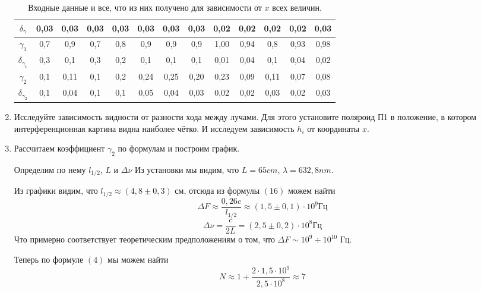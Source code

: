 \documentclass[a4paper, 12pt]{article}%
\begin{document}
\begin{enumerate}
\begin{table}[h!]
\begin{center}
\begin{tabular}{|c|c|c|c|c|c|c|c|c|c|c|c|c|}
$\delta_{\gamma}$   & 0,03 & 0,03 & 0,03 & 0,03 & 0,03 & 0,03 & 0,03 & 0,02 & 0,02 & 0,02 & 0,02 & 0,03 \\ \hline
$\gamma_1$          & 0,7  & 0,9  & 0,7  & 0,8  & 0,9  & 0,9  & 0,9  & 1,00 & 0,94 & 0,8  & 0,93 & 0,98 \\ \hline
$\delta_{\gamma_1}$ & 0,3  & 0,1  & 0,3  & 0,2  & 0,1  & 0,1  & 0,1  & 0,01 & 0,04 & 0,1  & 0,04 & 0,02 \\ \hline
$\gamma_2$          & 0,1  & 0,11 & 0,1  & 0,2  & 0,24 & 0,25 & 0,20 & 0,23 & 0,09 & 0,11 & 0,07 & 0,08 \\ \hline
$\delta_{\gamma_2}$ & 0,1  & 0,04 & 0,1  & 0,1  & 0,05 & 0,04 & 0,03 & 0,02 & 0,02 & 0,03 & 0,02 & 0,03 \\ \hline
\end{tabular}
\caption{Входные данные и все, что из них получено для зависимости от $x$ всех величин.}
\end{center}
\end{table}
\item Исследуйте зависимость видности от разности хода между лучами. Для этого установите поляроид П1 в положение, в котором интерференционная картина видна наиболее чётко. И исследуем зависимость $h_i$ от координаты $x$.
\item Рассчитаем коэффициент $\gamma_2$ по формулам и построим график.

Определим по нему $l_{1/2}$, $L$ и $\Delta \nu$
Из установки мы видим, что $L = 65 cm$, $\lambda = 632,8 nm$.

Из графики видим, что $l_{1/2} \approx (4,8 \pm 0,3)$ см, отсюда из формулы $(16)$ можем найти 
\[\Delta F \approx \frac{0,26 c}{l_{1/2}} \approx (1,5 \pm 0,1) \cdot 10^9 \text{Гц}\]
\[\Delta \nu = \frac{c}{2L} = (2,5 \pm 0,2) \cdot 10^8 \text{Гц}\]
Что примерно соответствует теоретическим предположениям о том, что $\Delta F \sim 10^9 \div 10^10$ Гц. 

Теперь по формуле $(4)$ мы можем найти 
\[N \approx 1 + \frac{2 \cdot 1,5 \cdot 10^9}{2,5 \cdot 10^8} \approx 7 \]


\end{enumerate}
\end{document}
